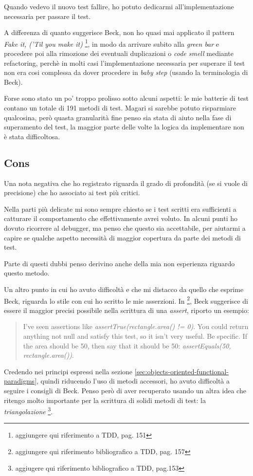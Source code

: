 Quando vedevo il nuovo test fallire, ho potuto dedicarmi
all'implementazione necessaria per passare il test. 

A differenza di quanto suggerisce Beck, non ho quasi mai applicato il
pattern \emph{Fake it, ('Til you make it)} \footnote{aggiungere qui
  riferimento a TDD, pag. 151}, in modo da arrivare subito alla
\emph{green bar} e procedere poi alla rimozione dei eventuali
duplicazioni o \emph{code smell} mediante refactoring, perch\`e in
molti casi l'implementazione necessaria per superare il test non era
cosi complessa da dover procedere in \emph{baby step} (usando la
terminologia di Beck).

Forse sono stato un po' troppo prolisso sotto alcuni aspetti: le mie
batterie di test contano un totale di 191 metodi di test. Magari si
sarebbe potuto risparmiare qualcosina, per\`o quasta granularit\`a
fine penso sia stata di aiuto nella fase di superamento del test, la
maggior parte delle volte la logica da implementare non \`e stata
difficoltosa.

\subsection{Cons}
Una nota negativa che ho registrato riguarda il grado di profondit\`a
(se si vuole di precisione) che ho associato ai test pi\`u critici.

Nella parti pi\`u delicate mi sono sempre chiesto se i test scritti
era sufficienti a catturare il comportamento che effettivamente avrei
voluto. In alcuni punti ho dovuto ricorrere al debugger, ma penso che
questo sia accettabile, per aiutarmi a capire se qualche aspetto
necessit\`a di maggior copertura da parte dei metodi di test.

Parte di questi dubbi penso derivino anche della mia non esperienza
riguardo questo metodo.

Un altro punto in cui ho avuto difficolt\`a e che mi distacco da
quello che esprime Beck, riguarda lo stile con cui ho scritto le mie
asserzioni. In \footnote{aggiungere qui riferimento bibliografico a
  TDD, pag. 157}, Beck suggerisce di essere il maggior precisi
possibile nella scrittura di una \emph{assert}, riporto un esempio:
\begin{quotation}
  I've seen assertions like \emph{assertTrue(rectangle.area() !=
    0)}. You could return anything not null and satisfy this test, so
  it isn't very useful. Be specific. If the area should be 50, then
  say that it should be 50: \emph{assertEquals(50, rectangle.area())}.
\end{quotation}
Credendo nei principi espressi nella sezione
\ref{sec:objects-oriented-functional-paradigms}, quindi riducendo
l'uso di metodi accessori, ho avuto difficolt\`a a seguire i consigli
di Beck. Penso per\`o di aver recuperato usando un altra idea che
ritengo molto importante per la scrittura di solidi metodi di test: la
\emph{triangolazione} \footnote{aggiugere qui riferimento
  bibliografico a TDD, pag.153}. 

